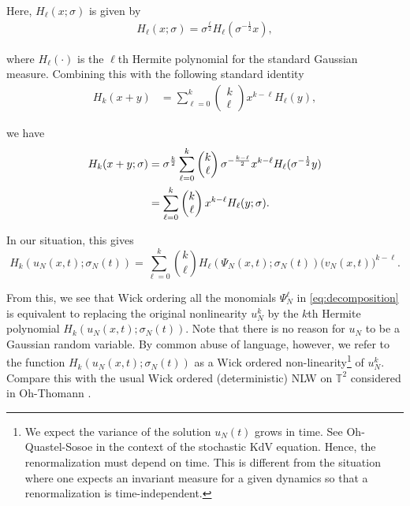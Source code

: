 \documentclass[letterpaper, 11pt,  reqno]{amsart}
\newcommand{\1}{\hspace{0.5mm}\text{I}\hspace{0.5mm}}
\newcommand{\noi}{\noindent}
\newcommand{\T}{\mathbb{T}}
\newcommand{\s}{\sigma}
\renewcommand{\l}{\ell}
\numberwithin{equation}{section}
\numberwithin{theorem}{section}
\begin{document}
\noi
Here,  
$H_\l(x; \s )$ is given by 
\begin{align*}
H_\l(x; \s )  = \s^\frac{\l}{2} H_\l(\s^{-\frac{1}{2}} x),
\end{align*}

\noi
 where $H_\l(\cdot)$ is the $\l$th Hermite polynomial for the standard Gaussian measure.
Combining this with the following standard identity
\begin{align*}
 H_k(x+y) 
& = \sum_{\l = 0}^k
\begin{pmatrix}
k \\ \l
\end{pmatrix}
x^{k - \l} H_\l(y), 
\end{align*}

\noi
we have 
\begin{align}
H_k(x+y; \s )
&  = \s^\frac{k}{2}\sum_{\l = 0}^k
\begin{pmatrix}
k \\ \l
\end{pmatrix}
\s^{-\frac{k-\l}{2}} x^{k - \l} H_\l(\s^{-\frac{1}{2}} y) \notag \\
&  = 
\sum_{\l = 0}^k
\begin{pmatrix}
k \\ \l
\end{pmatrix}
 x^{k - \l} H_\l(y; \s).
\label{Herm3}
\end{align}

\noi
In our situation, this gives 
\begin{equation*}
H_k(u_N(x, t);\s_N(t)) = \sum_{\l=0}^k {k\choose \ell} H_\ell(\Psi_N(x, t);\sigma_N(t)) 
\big(v_N(x, t)\big)^{k-\ell}.
\end{equation*}


\noi
From this, we see that 
 Wick ordering all the monomials $\Psi_N^\ell$ in 
\eqref{eq:decomposition}
 is equivalent to replacing the original nonlinearity $u_N^k$ by the $k$th Hermite polynomial 
 $H_k(u_N(x, t);\sigma_N(t))$. 
Note that there is no reason for $u_N$ to be a Gaussian random variable.
By common abuse of language, however, we refer to the function $H_k(u_N(x, t);\sigma_N(t))$ 
as a Wick ordered non-linearity\footnote{We expect the variance of the solution $u_N(t)$
grows in time.  See Oh-Quastel-Sosoe \cite{OQS2} in the context of the stochastic KdV equation.
Hence, the renormalization must depend on time.
This is different from the situation where one expects an invariant measure
for a given dynamics so that a renormalization is time-independent.}
of $u_N^k$.
Compare this with the usual Wick ordered (deterministic) NLW
on $\T^2$ considered in Oh-Thomann \cite{OT2}.
\end{document}
